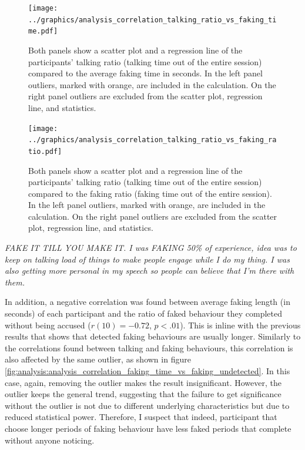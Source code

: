 \documentclass[]{simple-thesis}
\begin{document}
\begin{figure}
  \centering
  \texttt{[image: ../graphics/analysis\_correlation\_talking\_ratio\_vs\_faking\_time.pdf]}
  \caption{Both panels show a scatter plot and a regression line of the participants' talking ratio (talking time out of the entire session) compared to the average faking time in seconds. In the left panel outliers, marked with orange, are included in the calculation. On the right panel outliers are excluded from the scatter plot, regression line, and statistics.}
  \label{fig:analysis:correlation_talking_ratio_vs_faking_time}
\end{figure}

\begin{figure}
  \centering
  \texttt{[image: ../graphics/analysis\_correlation\_talking\_ratio\_vs\_faking\_ratio.pdf]}
  \caption{Both panels show a scatter plot and a regression line of the participants' talking ratio (talking time out of the entire session) compared to the faking ratio (faking time out of the entire session). In the left panel outliers, marked with orange, are included in the calculation. On the right panel outliers are excluded from the scatter plot, regression line, and statistics.}
  \label{fig:analysis:correlation_talking_ratio_vs_faking_ratio}
\end{figure}

\begin{displayquote}
  \textit{
    FAKE IT TILL YOU MAKE IT.
    I was FAKING 50\% of experience, idea was to keep on talking load of things to make people engage while I do my thing.
    I was also getting more personal in my speech so people can believe that I'm there with them.
  }
\end{displayquote}

In addition, a negative correlation was found between average faking length (in seconds) of each participant and the ratio of faked behaviour they completed without being accused ($r(10) = -0.72$, $p < .01$).
This is inline with the previous results that shows that detected faking behaviours are usually longer.
Similarly to the correlations found between talking and faking behaviours, this correlation is also affected by the same outlier, as shown in figure \ref{fig:analysis:analysis_correlation_faking_time_vs_faking_undetected}.
In this case, again, removing the outlier makes the result insignificant.
However, the outlier keeps the general trend, suggesting that the failure to get significance without the outlier is not due to different underlying characteristics but due to reduced statistical power.
Therefore, I suspect that indeed, participant that choose longer periods of faking behaviour have less faked periods that complete without anyone noticing.
\end{document}
